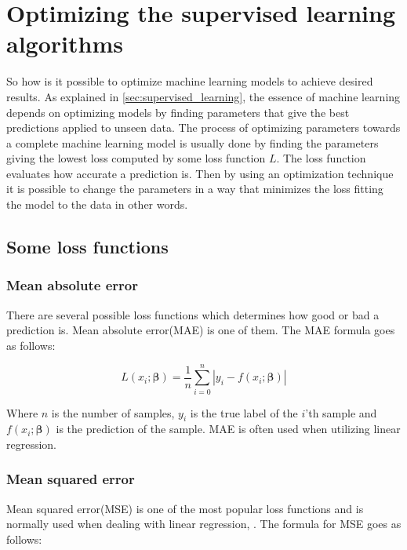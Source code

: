 \documentclass[../main.tex]{subfiles}
\begin{document}
\section{Optimizing the supervised learning algorithms}
\label{sec:optimization}

So how is it possible to optimize machine learning models to achieve desired results. As explained in \autoref{sec:supervised_learning}, the essence of machine learning depends on optimizing models by finding parameters that give the best predictions applied to unseen data. The process of optimizing parameters towards a complete machine learning model is usually done by finding the parameters giving the lowest loss computed by some loss function $L$. The loss function evaluates how accurate a prediction is. Then by using an optimization technique it is possible to change the parameters in a way that minimizes the loss fitting the model to the data in other words.

\subsection{Some loss functions}

\subsubsection{Mean absolute error}
There are several possible loss functions which determines how good or bad a prediction is. Mean absolute error(MAE) is one of them. The MAE formula goes as follows:

\begin{equation*}
    L(x_i; \boldsymbol{\beta})=\frac{1}{n}\sum_{i=0}^n|y_i-f(x_i; \boldsymbol{\beta})|
\end{equation*}

Where $n$ is the number of samples, $y_i$ is the true label of the \ensuremath{i}'th sample and $f(x_i; \boldsymbol{\beta})$ is the prediction of the sample. MAE is often used when utilizing linear regression. 

\subsubsection{Mean squared error}
Mean squared error(MSE) is one of the most popular loss functions and is normally used when dealing with linear regression, . The formula for MSE goes as follows:
\end{document}
